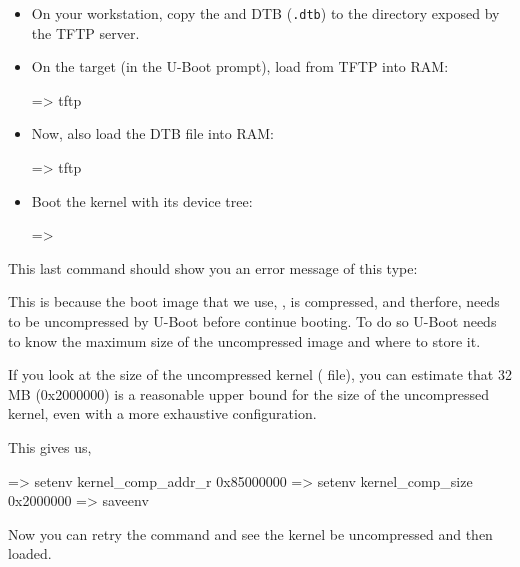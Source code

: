 \begin{itemize}

\item On your workstation, copy the {\tt {}} and DTB
(\texttt{\dtname}\texttt{.dtb}) to the directory exposed by the TFTP server.

\item On the target (in the U-Boot prompt), load {\tt {}} from
TFTP into RAM:
\begin{ubootinput}
=> tftp %
\end{ubootinput}

\item Now, also load the DTB file into RAM:
\begin{ubootinput}
=> tftp %
\end{ubootinput}

\item Boot the kernel with its device tree:
\begin{ubootinput}
=> %
\end{ubootinput}

\end{itemize}

\if{}
This last command should show you an error message of this type:

This is because the boot image that we use, , is compressed, and
therfore, needs to be uncompressed by U-Boot before continue booting. To do so
U-Boot needs to know the maximum size of the uncompressed image and where to
store it.

If you look at the size of the uncompressed kernel ( file),
you can estimate that 32 MB (0x2000000) is a reasonable upper bound
for the size of the uncompressed kernel, even with a more exhaustive
configuration.

This gives us,

\begin{ubootinput}
=> setenv kernel_comp_addr_r 0x85000000
=> setenv kernel_comp_size 0x2000000
=> saveenv
\end{ubootinput}

Now you can retry the  command and see the kernel be uncompressed
and then loaded.
\fi

